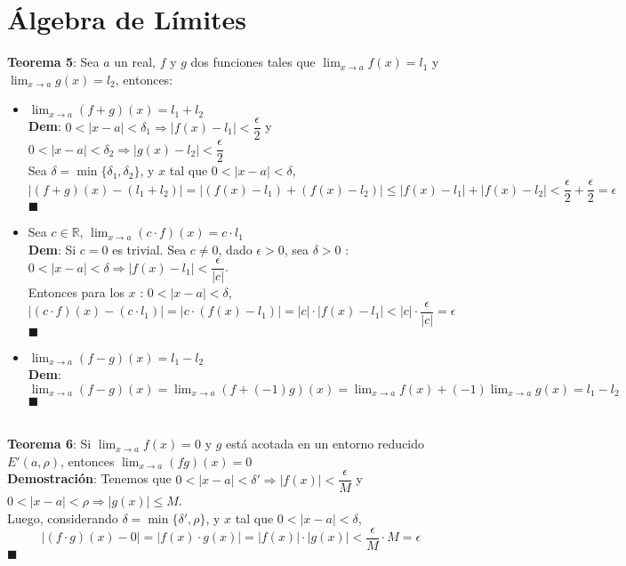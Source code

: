 \documentclass[11pt,a4paper]{article}
\newcommand*{\QEDA}{\null\nobreak\hfill\ensuremath{\blacksquare}}
\begin{document}
\section{\'Algebra de L\'imites}
\noindent \textbf{Teorema 5}: Sea $a$ un real, $f$ y $g$ dos funciones tales que $\displaystyle{\lim_{x\to a}f(x) = l_1}$ y $\displaystyle{\lim_{x\to a}g(x) = l_2}$, entonces:
\begin{itemize}
\item $\displaystyle{\lim_{x\to a}(f+g)(x) = l_1 + l_2}$\\
\textbf{Dem}: $0<|x-a|<\delta_1 \Rightarrow |f(x)-l_1| < \dfrac{\epsilon}{2}$ y $0<|x-a|<\delta_2 \Rightarrow |g(x)-l_2| < \dfrac{\epsilon}{2}$\\
Sea $\delta=\min\{\delta_1, \delta_2\}$, y $x$ tal que $0<|x-a|<\delta$,\\
$|(f+g)(x)-(l_1+l_2)| = |(f(x)-l_1)+(f(x)-l_2)| \leq |f(x)-l_1| + |f(x)-l_2| < \dfrac{\epsilon}{2} + \dfrac{\epsilon}{2} = \epsilon$\\
\QEDA
\item Sea $c\in \mathbb{R}$, $\displaystyle{\lim_{x\to a}(c\cdot f)(x) = c\cdot l_1}$\\
\textbf{Dem}: Si $c=0$ es trivial. Sea $c\not = 0$, dado $\epsilon > 0$, sea $\delta > 0$ : $0<|x-a|<\delta \Rightarrow |f(x)-l_1| < \dfrac{\epsilon}{|c|}$.\\
Entonces para los $x$ : $0<|x-a|<\delta$, $|(c\cdot f)(x) - (c\cdot l_1)| = |c \cdot (f(x)-l_1)| = |c|\cdot|f(x)-l_1| < |c|\cdot\dfrac{\epsilon}{|c|}=\epsilon$\\
\QEDA
\item $\displaystyle{\lim_{x\to a}(f-g)(x) = l_1 - l_2}$\\
\textbf{Dem}: $\displaystyle{\lim_{x\to a}(f-g)(x) = \lim_{x\to a}(f+ (-1)g)(x) = \lim_{x\to a}f(x) + (-1)\lim_{x\to a}g(x) = l_1 - l_2}$\\
\QEDA
\end{itemize}
\noindent \dotfill\\

\noindent \textbf{Teorema 6}: Si $\displaystyle{\lim_{x\to a}f(x) = 0}$ y $g$ est\'a acotada en un entorno reducido $E'(a,\rho)$, entonces $\displaystyle{\lim_{x\to a}(fg)(x) = 0}$\\
\noindent \textbf{Demostraci\'on}: Tenemos que $0<|x-a|<\delta' \Rightarrow |f(x)|<\dfrac{\epsilon}{M}$ y $0<|x-a|<\rho \Rightarrow |g(x)| \leq M$.\\
Luego, considerando $\delta = \min\{\delta', \rho\}$, y $x$ tal que $0<|x-a|<\delta$, $$|(f\cdot g)(x)-0| = |f(x)\cdot g(x)| = |f(x)|\cdot|g(x)| < \dfrac{\epsilon}{M} \cdot M = \epsilon$$
\QEDA\\
\end{document}
